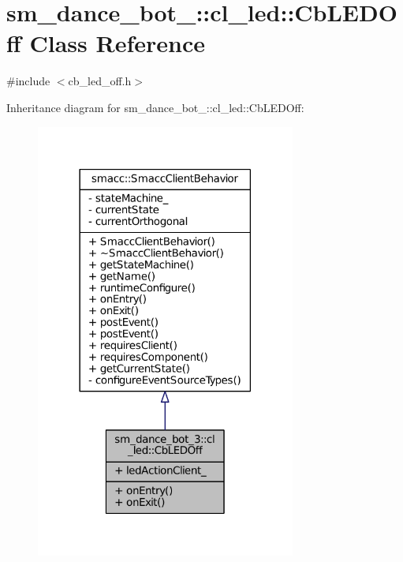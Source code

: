 \hypertarget{classsm__dance__bot__3_1_1cl__led_1_1CbLEDOff}{}\section{sm\+\_\+dance\+\_\+bot\+\_\+:\+:cl\+\_\+led\+:\+:Cb\+L\+E\+D\+Off Class Reference}
\label{classsm__dance__bot__3_1_1cl__led_1_1CbLEDOff}


{\ttfamily \#include $<$cb\+\_\+led\+\_\+off.\+h$>$}



Inheritance diagram for sm\+\_\+dance\+\_\+bot\+\_\+:\+:cl\+\_\+led\+:\+:Cb\+L\+E\+D\+Off\+:
\nopagebreak
\begin{figure}[H]
\begin{center}
\leavevmode
\includegraphics[width=242pt]{classsm__dance__bot__3_1_1cl__led_1_1CbLEDOff__inherit__graph}
\end{center}
\end{figure}


